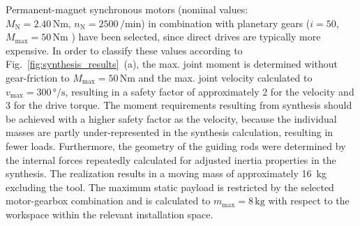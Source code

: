 \documentclass[runningheads,hidelinks]{llncs}
\begin{document}
Permanent-magnet synchronous motors (nominal values: $M_\text{N} = 2.40\,\si{\newton\metre},\, n_\text{N} = 2500 \,\si{\per\minute}$) in combination with planetary gears ($i=50$, $M_\text{max} = 50\,\si{\newton\metre}$ ) have been selected, since direct drives are typically more expensive.
In order to classify these values according to Fig.~\ref{fig:synthesis_results}~(a), the max. joint moment is determined without gear-friction to $M_\text{max} = 50\,\si{\newton\metre}$ and the max. joint velocity calculated to $v_\text{max} = 300\,\si{\degree\per\second}$, resulting in a safety factor of approximately 2 for the velocity and 3 for the drive torque.
The moment requirements resulting from synthesis should be achieved with a higher safety factor as the velocity, because the individual masses are partly under-represented in the synthesis calculation, resulting in fewer loads.
Furthermore, the geometry of the guiding rods were determined by the internal forces repeatedly calculated for adjusted inertia properties in the synthesis.
The realization results in a moving mass of approximately \SI{16}{\kilo\gram} excluding the tool.
The maximum static payload is restricted by the selected motor-gearbox combination and is calculated to $m_\text{max} = 8 \,\si{\kilo\gram}$ with respect to the workspace within the relevant installation space.
\end{document}

